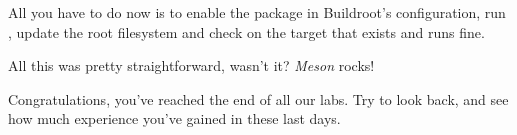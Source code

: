 All you have to do now is to enable the 
package in Buildroot's configuration, run , update the root
filesystem and check on the target that
 exists and runs fine.

All this was pretty straightforward, wasn't it? {\em Meson} rocks!

Congratulations, you've reached the end of all our labs. Try to look
back, and see how much experience you've gained in these last days.
